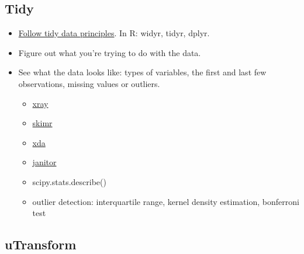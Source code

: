 \documentclass[]{book}
\providecommand{\tightlist}{%
  \setlength{\itemsep}{0pt}\setlength{\parskip}{0pt}}
\theoremstyle{definition}
\theoremstyle{definition}
\theoremstyle{definition}
\theoremstyle{remark}
\begin{document}
\subsection{Tidy}\label{tidy}

\begin{itemize}
\item
  \href{http://vita.had.co.nz/papers/tidy-data.pdf}{Follow tidy data
  principles}. In R: widyr, tidyr, dplyr.
\item
  Figure out what you're trying to do with the data.
\item
  See what the data looks like: types of variables, the first and last
  few observations, missing values or outliers.

  \begin{itemize}
  \tightlist
  \item
    \href{https://blog.datascienceheroes.com/x-ray-vision-on-your-datasets/}{xray}
  \item
    \href{https://github.com/ropenscilabs/skimr}{skimr}
  \item
    \href{https://github.com/ujjwalkarn/xda}{xda}
  \item
    \href{https://cran.r-project.org/web/packages/janitor/vignettes/introduction.html}{janitor}
  \item
    scipy.stats.describe()
  \item
    outlier detection: interquartile range, kernel density estimation,
    bonferroni test
  \end{itemize}
\end{itemize}

\subsection{uTransform}\label{utransform}
\end{document}
